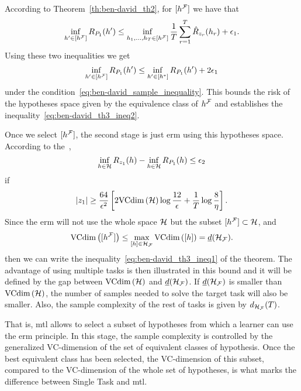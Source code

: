 According to Theorem~\ref{th:ben-david_th2}, for $\lbrack h^{\mathcal{F}}\rbrack$ we have that
\begin{equation}
    \nonumber
    {\inf_{h' \in \lbrack h^{\mathcal{F}}\rbrack}R_{P_1}(h')} \leq \inf_{h_1, \ldots, h_T \in \lbrack h^{\mathcal{F}}\rbrack} \frac{1}{T} \sum_{r=1}^T \hat{R}_{z_r}(h_r)  + \epsilon_1.
\end{equation}
Using these two inequalities we get
\begin{equation}
    \nonumber
    \inf_{h' \in \lbrack h^{\mathcal{F}}\rbrack}R_{P_1}(h') \leq \inf_{h' \in \lbrack h^*\rbrack}R_{P_1}(h') + 2\epsilon_1 
\end{equation}
under the condition~\eqref{eq:ben-david_sample_inequality}. This bounds the risk of the hypotheses space given by the equivalence class of $h^{\mathcal{F}}$ and establishes the inequality~\eqref{eq:ben-david_th3_ineq2}.
%

Once we select $\lbrack h^{\mathcal{F}}\rbrack$, the second stage is just \acrshort{erm} using this hypotheses space.
%
According to the~\cite{vapnik1982estimation},
\begin{equation}\nonumber
    \inf_{h \in \mathcal{H}} R_{z_1}(h) - \inf_{h \in \mathcal{H}} R_{P_1}(h) \leq \epsilon_2
\end{equation}
if
\begin{equation}
    \nonumber
    \left|z_1\right| \geq  \frac{64}{\epsilon^2} \left[2 \text{VCdim}\left(\mathcal{H}\right) \log \frac{12}{\epsilon} + \frac{1}{T}\log\frac{8}{\eta} \right] .
\end{equation}
Since the \acrshort{erm} will not use the whole space $\mathcal{H}$ but the subset $\lbrack h^{\mathcal{F}}\rbrack \subset \mathcal{H}$, and
$$\text{VCdim}\left(\lbrack h^{\mathcal{F}}\rbrack\right) \leq \max_{\lbrack h\rbrack \in \mathcal{H}_{\mathcal{F}}} \text{VCdim}\left(\lbrack h\rbrack\right) = \underline{d}(\mathcal{H}_{\mathcal{F}}).$$
 then we can write the inequality~\eqref{eq:ben-david_th3_ineq1} of the theorem.
%
The advantage of using multiple tasks is then illustrated in this bound and it will be defined by the gap between $\text{VCdim}\left(\mathcal{H}\right)$ and $\underline{d}(\mathcal{H}_{\mathcal{F}})$. If $\underline{d}(\mathcal{H}_{\mathcal{F}})$ is smaller than $\text{VCdim}\left(\mathcal{H}\right)$, the number of samples needed to solve the target task will also be smaller.
Also, the sample complexity of the rest of tasks is given by $d_{\mathcal{H}_{\mathcal{F}}}(T)$.

That is, \acrshort{mtl} allows to select a subset of hypotheses from which a learner can use the \acrshort{erm} principle. In this stage, the sample complexity is controlled by the generalized VC-dimension of the set of equivalent classes of hypothesis. Once the best equivalent class has been selected, 
the VC-dimension of this subset, compared to the VC-dimension of the whole set of hypotheses, is what marks the difference between Single Task and \acrshort{mtl}.

